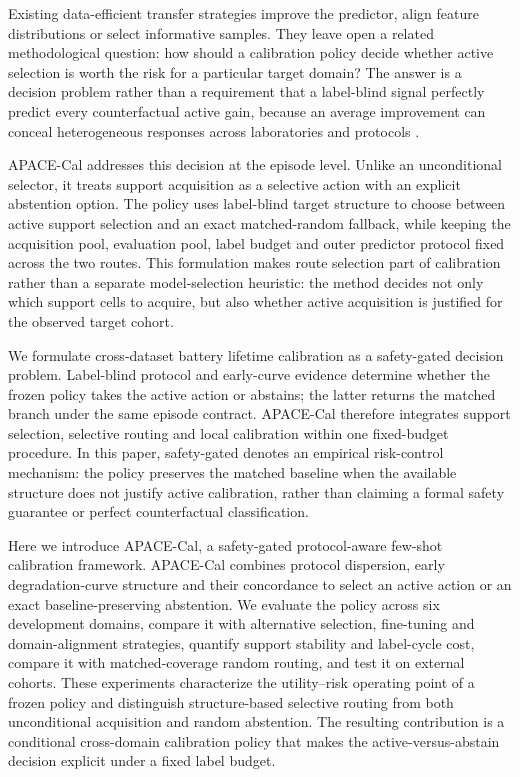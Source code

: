 \documentclass[preprint,12pt]{elsarticle}
\begin{document}
Existing data-efficient transfer strategies improve the predictor, align feature distributions or select informative samples. They leave open a related methodological question: how should a calibration policy decide whether active selection is worth the risk for a particular target domain? The answer is a decision problem rather than a requirement that a label-blind signal perfectly predict every counterfactual active gain, because an average improvement can conceal heterogeneous responses across laboratories and protocols \citep{li2019review,che2023prognostics,lanubile2024domain,nascimento2023bayesian,che2023uncertainty,liu2021uncertainty,wang2023ress,xiao2023review,jo2021soh,ezemobi2021generalization,li2020ica,zhou2022tcn}.

APACE-Cal addresses this decision at the episode level. Unlike an unconditional selector, it treats support acquisition as a selective action with an explicit abstention option. The policy uses label-blind target structure to choose between active support selection and an exact matched-random fallback, while keeping the acquisition pool, evaluation pool, label budget and outer predictor protocol fixed across the two routes. This formulation makes route selection part of calibration rather than a separate model-selection heuristic: the method decides not only which support cells to acquire, but also whether active acquisition is justified for the observed target cohort.

We formulate cross-dataset battery lifetime calibration as a safety-gated decision problem. Label-blind protocol and early-curve evidence determine whether the frozen policy takes the active action or abstains; the latter returns the matched branch under the same episode contract. APACE-Cal therefore integrates support selection, selective routing and local calibration within one fixed-budget procedure. In this paper, safety-gated denotes an empirical risk-control mechanism: the policy preserves the matched baseline when the available structure does not justify active calibration, rather than claiming a formal safety guarantee or perfect counterfactual classification.

Here we introduce APACE-Cal, a safety-gated protocol-aware few-shot calibration framework. APACE-Cal combines protocol dispersion, early degradation-curve structure and their concordance to select an active action or an exact baseline-preserving abstention. We evaluate the policy across six development domains, compare it with alternative selection, fine-tuning and domain-alignment strategies, quantify support stability and label-cycle cost, compare it with matched-coverage random routing, and test it on external cohorts. These experiments characterize the utility--risk operating point of a frozen policy and distinguish structure-based selective routing from both unconditional acquisition and random abstention. The resulting contribution is a conditional cross-domain calibration policy that makes the active-versus-abstain decision explicit under a fixed label budget.
\end{document}
